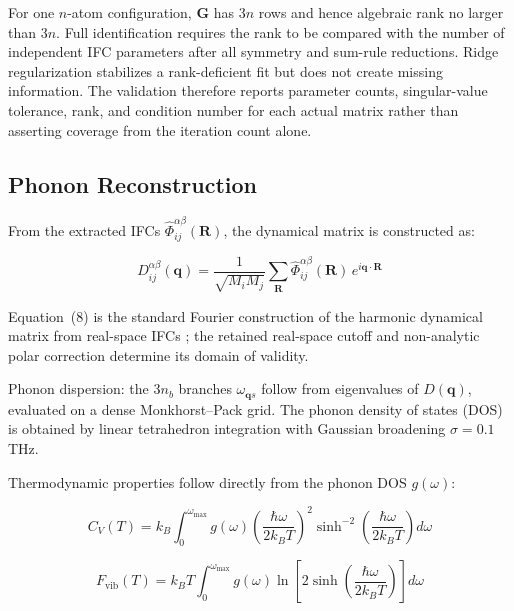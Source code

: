 \documentclass[aps,prb,reprint,amsmath,amssymb,floatfix]{revtex4-2}
\begin{document}
\color{revisionblue}
For one \(n\)-atom configuration, \(\mathbf G\) has \(3n\) rows and hence
algebraic rank no larger than \(3n\). Full identification requires the rank to
be compared with the number of independent IFC parameters after all symmetry
and sum-rule reductions. Ridge regularization stabilizes a rank-deficient fit
but does not create missing information. The validation therefore reports parameter counts, singular-value tolerance, rank, and condition number
for each actual matrix rather than asserting coverage from the iteration count
alone.
\color{black}

\subsection{Phonon Reconstruction}\label{phonon-reconstruction}

From the extracted IFCs \(\hat{\Phi}_{ij}^{\alpha\beta}(\mathbf{R})\),
the dynamical matrix is constructed as:

\color{revisionblue}
\begin{equation}
D_{ij}^{\alpha\beta}(\mathbf{q}) = \frac{1}{\sqrt{M_i M_j}} \sum_{\mathbf{R}} \hat{\Phi}_{ij}^{\alpha\beta}(\mathbf{R})\, e^{i\mathbf{q}\cdot\mathbf{R}}
\end{equation}
\color{black}

\color{revisionblue}
Equation~(8) is the standard Fourier construction of the harmonic dynamical
matrix from real-space IFCs \cite{ref13}; the retained real-space cutoff and
non-analytic polar correction determine its domain of validity.
\color{black}

Phonon dispersion: the \(3n_b\) branches \(\omega_{\mathbf{q}s}\) follow
from eigenvalues of \(D(\mathbf{q})\), evaluated on a dense
Monkhorst--Pack grid. The phonon density of states (DOS) is obtained by
linear tetrahedron integration with Gaussian broadening \(\sigma = 0.1\)
THz.

Thermodynamic properties follow directly from the phonon DOS
\(g(\omega)\):

\color{revisionblue}
\begin{equation}
C_V(T) = k_B \int_0^{\omega_\text{max}} g(\omega) \left(\frac{\hbar\omega}{2k_BT}\right)^2 \sinh^{-2}\!\left(\frac{\hbar\omega}{2k_BT}\right) d\omega
\end{equation}
\color{black}

\color{revisionblue}
\begin{equation}
F_\text{vib}(T) = k_B T \int_0^{\omega_\text{max}} g(\omega) \ln\!\left[2\sinh\!\left(\frac{\hbar\omega}{2k_BT}\right)\right] d\omega
\end{equation}
\color{black}
\end{document}
